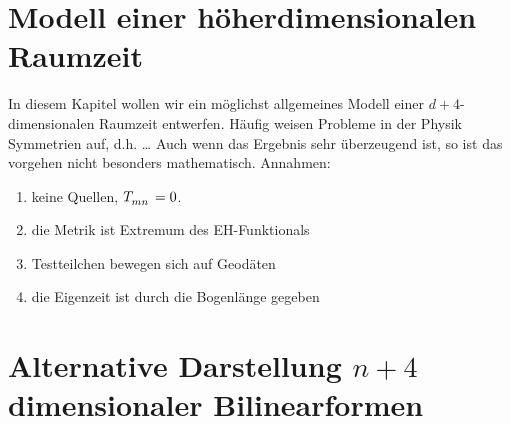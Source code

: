 \section{Modell einer höherdimensionalen Raumzeit}

In diesem Kapitel wollen wir ein möglichst allgemeines Modell einer
$d+4$-dimensionalen Raumzeit entwerfen. Häufig weisen Probleme in der Physik
Symmetrien auf, d.h. \ldots
Auch wenn das Ergebnis sehr überzeugend ist, so ist das vorgehen nicht besonders
mathematisch. Annahmen:
\begin{enumerate}
\item keine Quellen, $\tensor{T}{_m_n}=0$.
\item die Metrik ist Extremum des EH-Funktionals
\item Testteilchen bewegen sich auf Geodäten
\item die Eigenzeit ist durch die Bogenlänge gegeben
\end{enumerate}
\section{Alternative Darstellung $n+4$ dimensionaler Bilinearformen}

